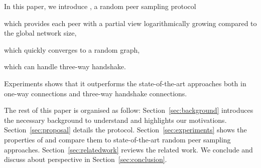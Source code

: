 In this paper, we introduce \SCAMPLON{}, a random peer sampling protocol
\begin{inparaenum}[(i)]
\item which provides each peer with a partial view logarithmically growing
  compared to the global network size,
\item which quickly converges to a random graph,
\item which can handle three-way handshake.
\end{inparaenum}
Experiments shows that it outperforms the state-of-the-art approaches both in
one-way connections and three-way handshake connections.

The rest of this paper is organised as follow: Section~\ref{sec:background}
introduces the necessary background to understand \SCAMPLON{} and highlights
our motivations. Section~\ref{sec:proposal} details the \SCAMPLON{} protocol.
Section~\ref{sec:experiments} shows the properties of \SCAMPLON{} and compare
them to state-of-the-art random peer sampling
approaches. Section~\ref{sec:relatedwork} reviews the related work. We conclude
and discuss about perspective in Section~\ref{sec:conclusion}.

